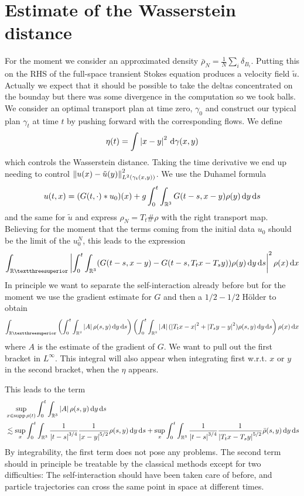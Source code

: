\documentclass[abstracton, paper=a4, fontsize=11pt,DIV=12,bibliography=totoc]{scrartcl}
\begin{document}
\section{Estimate of the Wasserstein distance}

For the moment we consider an approximated density $\bar{\rho}_N=\frac 1N \sum_i \delta_{B_i}$. Putting this on the RHS of the full-space transient Stokes equation produces a velocity field $\tilde u$. Actually we expect that it should be possible to take the deltas concentrated on the bounday but there was some divergence in the computation so we took balls. We consider an optimal transport plan at time zero, $\gamma_0$ and construct our typical plan $\gamma_t$ at time $t$ by pushing forward with the corresponding flows. We define 
\begin{align*}
    \eta(t)=\int \left\lvert x-y\right\rvert^2 \, \mathrm{d} \gamma(x,y)
\end{align*}
which controls the Wasserstein distance. Taking the time derivative we end up needing to control $\left\lVert u(x)-\tilde{u}(y)\right\rVert^2_{L^2(\gamma_t(x,y))}$. We use the Duhamel formula
\begin{align*}
    u(t,x)=(G(t,\cdot)\ast u_0)(x)+g\int_0^t\int_{\mathbb{R}^3}G(t-s,x-y)\rho(y)\, \mathrm{d} y\, \mathrm{d} s
\end{align*}
and the same for $\tilde u$ and express $\rho_N=T_t\# \rho$ with the right transport map. Believing for the moment that the terms coming from the initial data $u_0$ should be the limit of the $u_{0}^N$, this leads to the expression 
\begin{align*}
    \int_{\R³}\abs{\int_0^t\int_{\R^3}(G(t-s,x-y)-G(t-s,T_tx-T_sy))\rho(y)\dd y\dd s}^2\rho(x)\dd x
\end{align*}
In principle we want to separate the self-interaction already before but for the moment we use the gradient estimate for $G$ and then a $1/2-1/2$ Hölder to obtain 
\begin{align*}
    \int_{\R³}\bra{\int_0^t \int_{\R^3}\abs{A}\rho(s,y)\dd y \dd s}\bra{\int_0^t\int_{\R^3}\abs{A}(\abs{T_tx-x}^2+\abs{T_sy-y}^2)\rho(s,y)\dd y \dd s}\rho(x)\dd x
\end{align*}
where $A$ is the estimate of the gradient of $G$. We want to pull out the first bracket in $L^{\infty}$. This integral will also appear when integrating first w.r.t. $x$ or $y$ in the second bracket, when the $\eta$ appears.

This leads to the term
\begin{align*}
    &\sup_{x\in\operatorname*{supp} \rho(t)} \int_0^t \int_{\mathbb{R}^3}\left\lvert A\right\rvert\rho(s,y)\, \mathrm{d} y \, \mathrm{d} s\\ &\lesssim \sup_x \int_0^t \int_{\mathbb{R}^3}\frac{1}{\left\lvert t-s\right\rvert^{3/4}}\frac{1}{\left\lvert x-y\right\rvert^{5/2}}\rho(s,y)\, \mathrm{d} y \, \mathrm{d} s+\sup_x \int_0^t \int_{\mathbb{R}^3}\frac{1}{\left\lvert t-s\right\rvert^{3/4}}\frac{1}{\left\lvert T_tx-T_sy\right\rvert^{5/2}}\bar\rho(s,y)\, \mathrm{d} y \, \mathrm{d} s
\end{align*}
By integrability, the first term does not pose any problems. The second term should in principle be  treatable by the classical methods except for two difficulties: The self-interaction should have been taken care of before, and particle trajectories can cross the same point in space at different times. 
\end{document}
